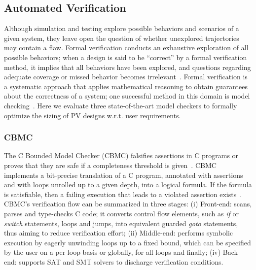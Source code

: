 \documentclass[10pt,conference]{IEEEtran}
\begin{document}
\subsection{Automated Verification}
\label{sec:AutomatedVerification}
Although simulation and testing explore possible behaviors and scenarios of a given system, they leave open the question of whether unexplored trajectories may contain a flaw. Formal verification conducts an exhaustive exploration of all possible behaviors; when a design is said to be ``correct'' by a formal verification method, it implies that all behaviors have been explored, and questions regarding adequate coverage or missed behavior becomes irrelevant~\cite{Clarke2012}. Formal verification is a systematic approach that applies mathematical reasoning to obtain guarantees about the correctness of a system; one successful method in this domain is model checking~\cite{Clarke2012}. Here we evaluate three state-of-the-art model checkers to formally optimize the sizing of PV designs w.r.t. user requirements.
\subsubsection{CBMC}
The C Bounded Model Checker (CBMC) falsifies assertions in C programs or proves that they are safe if a completeness threshold is given~\cite{Kroening}. CBMC implements a bit-precise translation of a C program, annotated with assertions and with loops unrolled up to a given depth, into a logical formula. If the formula is satisfiable, then a failing execution that leads to a violated assertion exists~\cite{Kroening}. CBMC's verification flow can be summarized in three stages: (i) Front-end: scans, parses and type-checks C code; it converts control flow elements, such as \textit{if} or \textit{switch} statements, loops and jumps, into equivalent guarded \textit{goto} statements, thus aiming to reduce verification effort; (ii) Middle-end: performs symbolic execution by eagerly unwinding loops up to a fixed bound, which can be specified by the user on a per-loop basis or globally, for all loops and finally; (iv) Back-end: supports SAT and SMT solvers to discharge verification conditions. 
\end{document}
